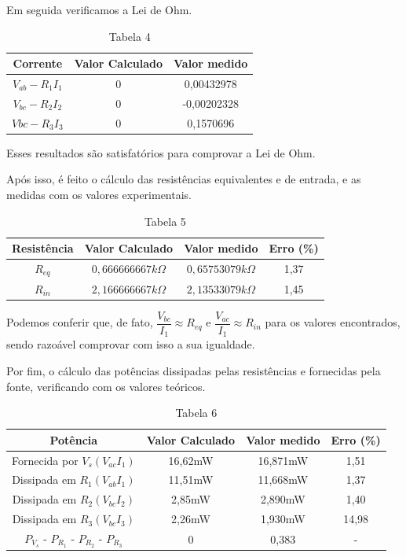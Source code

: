 \documentclass[a4 paper]{article}
\newcommand{\parag}{\hspace{30pt}}
\begin{document}
\newpage
\parag Em seguida verificamos a Lei de Ohm.

\begin{table}[h]
\centering
\begin{tabular}{|c|c|c|}
\hline
Corrente & Valor Calculado & Valor medido\\\hline
$V_{ab}-R_1I_1$ & 0 & 0,00432978 \\\hline
$V_{bc}-R_2I_2$ & 0 & -0,00202328 \\\hline
$V{bc}-R_3I_3$ & 0 & 0,1570696\\\hline
\end{tabular}
\caption*{Tabela 4}
\end{table}

\vspace{20pt}
\parag Esses resultados são satisfatórios para comprovar a Lei de Ohm.

\parag Após isso, é feito o cálculo das resistências equivalentes e de entrada, e as medidas com os valores experimentais.


\begin{table}[h]
\centering
\begin{tabular}{|c|c|c|c|}
\hline
Resistência & Valor Calculado & Valor medido & Erro (\%)\\ \hline
$R_{eq}$ & $0,666666667k\Omega$ & $0,65753079k\Omega$  & 1,37 \\\hline
$R_{in}$ & $2,166666667k\Omega$ & $2,13533079k\Omega$ & 1,45 \\\hline
\end{tabular}
\caption*{Tabela 5}
\end{table}

\vspace{20pt}

\parag Podemos conferir que, de fato, $\dfrac{V_{bc}}{I_1}\approx R_{eq}$ e $\dfrac{V_{ac}}{I_1}\approx R_{in}$ para os valores encontrados, sendo razoável comprovar com isso a sua igualdade.

\parag Por fim, o cálculo das potências dissipadas pelas resistências e fornecidas pela fonte, verificando com os valores teóricos.

\begin{table}[h]
\centering
\begin{tabular}{|c|c|c|c|}
\hline
Potência & Valor Calculado & Valor medido & Erro (\%)\\ \hline
Fornecida por $V_s (V_{ac}I_1)$ & 16,62mW & 16,871mW & 1,51\\\hline
Dissipada em $R_1 (V_{ab}I_1) $ & 11,51mW &   11,668mW & 1,37\\\hline
Dissipada em $R_2 (V_{bc}I_2)$ & 2,85mW & 2,890mW & 1,40\\\hline
Dissipada em $R_3 (V_{bc}I_3)$ & 2,26mW & 1,930mW & 14,98\\\hline
$P_{V_s}$ - $P_{R_1}$ -  $P_{R_2}$ - $P_{R_3}$ &   0 & 0,383 & - \\\hline
\end{tabular}
\caption*{Tabela 6}
\end{table}
\vspace{10pt}
\end{document}
